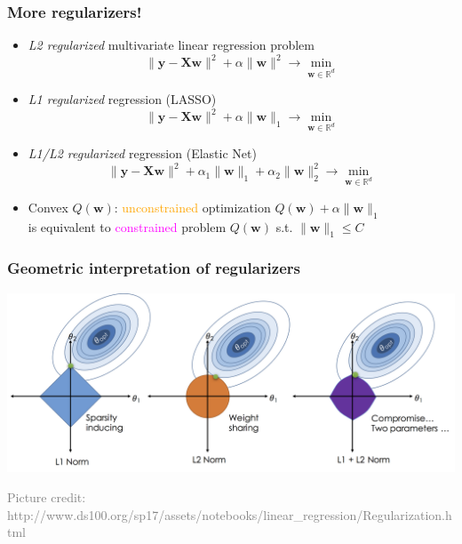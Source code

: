 \documentclass[usenames,dvipsnames,aspectratio=169]{beamer}
\begin{document}
\begin{frame}
\frametitle{More regularizers!}

\begin{itemize}

  \item \textit{L2 regularized} multivariate linear regression problem
  \[
    \lVert \bm{y} - \bm{X} \mathbf{w}  \rVert^2 
    +
    \alpha \lVert \mathbf{w} \rVert^2 
    \to 
    \min_{\mathbf{w} \in \mathbb{R}^d}
  \]

  \item \textit{L1 regularized} regression (LASSO)
  \[
    \lVert \bm{y} - \bm{X} \mathbf{w} \rVert^2 
    +
    \alpha \lVert \mathbf{w} \rVert_1
    \to 
    \min_{\mathbf{w} \in \mathbb{R}^d}
  \]

  \item \textit{L1/L2 regularized} regression (Elastic Net)
  \[
    \lVert \bm{y} - \bm{X} \mathbf{w} \rVert^2 
    +
    \alpha_1 \lVert \mathbf{w} \rVert_1
    +
    \alpha_2 \lVert \mathbf{w} \rVert^2_2
    \to 
    \min_{\mathbf{w} \in \mathbb{R}^d}
  \]

  \pause
  \item Convex $Q(\mathbf{w})$: 
    \textcolor{orange}{unconstrained} optimization 
    $Q(\mathbf{w}) + \alpha \lVert \mathbf{w} \rVert_1$\\
    is equivalent to \textcolor{Fuchsia}{constrained} problem
    $Q(\mathbf{w})$ s.t. $\lVert \mathbf{w} \rVert_1 \leqslant C$

\end{itemize}

\end{frame}



\begin{frame}
\frametitle{Geometric interpretation of regularizers}

\begin{center}
  \includegraphics[width=\columnwidth]{norm_balls.png}
\end{center}

\vspace{-4mm}
\begin{flushright}
{\footnotesize \textcolor{gray}{Picture credit: 
http://www.ds100.org/sp17/assets/notebooks/linear\_regression/Regularization.html}}
\end{flushright}

\end{frame}
\end{document}
